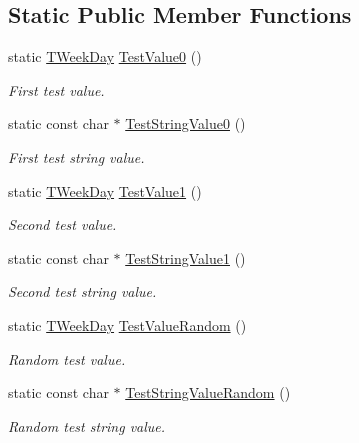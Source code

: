 \subsection*{Static Public Member Functions}
\begin{DoxyCompactItemize}
\item 
static \hyperlink{namespace_c_value___t_week_day_a6412f204509f223b789fb5f1a61a6124}{T\+Week\+Day} \hyperlink{class_c_value___t_week_day_1_1_c_value_ab2953ef7d3421ad741bed333e2188874}{Test\+Value0} ()
\begin{DoxyCompactList}\small\item\em First test value. \end{DoxyCompactList}\item 
static const char $\ast$ \hyperlink{class_c_value___t_week_day_1_1_c_value_ae28f515b823fa787ebc70b9498a0cb49}{Test\+String\+Value0} ()
\begin{DoxyCompactList}\small\item\em First test string value. \end{DoxyCompactList}\item 
static \hyperlink{namespace_c_value___t_week_day_a6412f204509f223b789fb5f1a61a6124}{T\+Week\+Day} \hyperlink{class_c_value___t_week_day_1_1_c_value_a8841fa6df3e84da037d9d34cc87a2581}{Test\+Value1} ()
\begin{DoxyCompactList}\small\item\em Second test value. \end{DoxyCompactList}\item 
static const char $\ast$ \hyperlink{class_c_value___t_week_day_1_1_c_value_a333999118ee2a849c35d2aa9aa6bc828}{Test\+String\+Value1} ()
\begin{DoxyCompactList}\small\item\em Second test string value. \end{DoxyCompactList}\item 
static \hyperlink{namespace_c_value___t_week_day_a6412f204509f223b789fb5f1a61a6124}{T\+Week\+Day} \hyperlink{class_c_value___t_week_day_1_1_c_value_a4d63e74d431ec7af57711f39ab703a8c}{Test\+Value\+Random} ()
\begin{DoxyCompactList}\small\item\em Random test value. \end{DoxyCompactList}\item 
static const char $\ast$ \hyperlink{class_c_value___t_week_day_1_1_c_value_a660e41950e476580acf00793fb43839a}{Test\+String\+Value\+Random} ()
\begin{DoxyCompactList}\small\item\em Random test string value. \end{DoxyCompactList}\end{DoxyCompactItemize}
